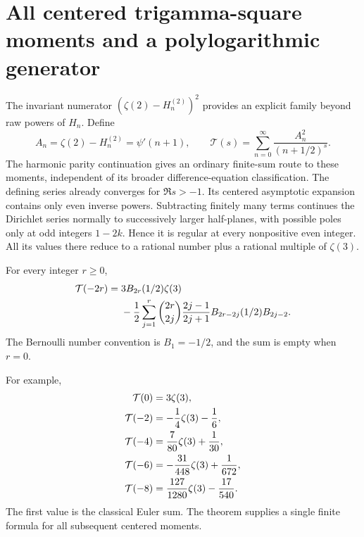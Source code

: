\section{All centered trigamma-square moments and a polylogarithmic generator}
\label{ghp:square:sec}

The invariant numerator $(\zeta(2)-H_n^{(2)})^2$ provides an explicit
family beyond raw powers of $H_n$. Define
\begin{equation}\label{ghp:def:square}
 A_n=\zeta(2)-H_n^{(2)}=\psi'(n+1),\qquad
 \mathcal T(s)=\sum_{n=0}^{\infty}\frac{A_n^2}{(n+1/2)^s}.
\end{equation}
The harmonic parity continuation \cite{ghp:report} gives an ordinary finite-sum route to these moments, independent of its broader difference-equation classification. The defining series already converges for $\Re s>-1$. Its centered asymptotic expansion contains only even inverse powers.
Subtracting finitely many terms continues the Dirichlet series normally
to successively larger half-planes, with possible poles only at odd
integers $1-2k$. Hence it is regular at every nonpositive even integer. All its values
there reduce to a rational number plus a rational multiple of
$\zeta(3)$.

\begin{theorem}
\label{ghp:thm:square}
For every integer $r\geq0$,
\begin{align}\label{ghp:eq:all-square}
 \mathcal T(-2r)={}&3B_{2r}(1/2)\zeta(3)\notag\\
 &-\frac12\sum_{j=1}^{r}\binom{2r}{2j}
   \frac{2j-1}{2j+1}B_{2r-2j}(1/2)B_{2j-2}.
\end{align}
The Bernoulli number convention is $B_1=-1/2$, and the sum is empty
when $r=0$.
\end{theorem}

For example,
\begin{align}\label{ghp:eq:square-table}
 \mathcal T(0)&=3\zeta(3),\notag\\
 \mathcal T(-2)&=-\frac14\zeta(3)-\frac16,\notag\\
 \mathcal T(-4)&=\frac7{80}\zeta(3)+\frac1{30},\notag\\
 \mathcal T(-6)&=-\frac{31}{448}\zeta(3)+\frac1{672},\notag\\
 \mathcal T(-8)&=\frac{127}{1280}\zeta(3)-\frac{17}{540}.
\end{align}
The first value is the classical Euler sum. The theorem supplies a
single finite formula for all subsequent centered moments.

